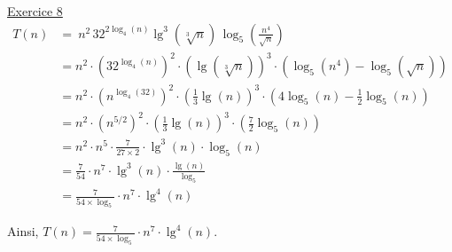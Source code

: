 \documentclass[11pt]{article}
\begin{document}
\bigskip


\underline{Exercice 8} 
\begin{align*}
   T(n)&=\ n^2\, 32^{ 2\log_4(n)} \lg^3\left(\sqrt[3]{n}\right) \, \log_5\left(\frac{n^4}{\sqrt{n}} \right) \\
   &= n^{2}\cdot \left(32^{\log_4(n)}\right)^{2}\cdot \left(\lg(\sqrt[3]{n})\right)^{3}\cdot \left(\log_5(n^{4})-\log_5(\sqrt{n})\right)\\
   &= n^{2} \cdot \left(n^{\log_4(32)}\right)^{2}\cdot \left(\frac{1}{3}\lg(n)\right)^{3}\cdot \left(4\log_5(n) - \frac{1}{2}\log_5(n)\right)\\
   &= n^{2} \cdot \left(n^{5/2}\right)^{2} \cdot \left(\frac{1}{3}\lg(n)\right)^{3} \cdot \left(\frac{7}{2}\log_5(n)\right)\\
   &=n^{2} \cdot n^{5} \cdot \frac{7}{27\times2} \cdot\lg^{3}(n) \cdot \log_5(n)\\
   &=\frac{7}{54}\cdot n^{7}\cdot\lg^{3}(n) \cdot \frac{\lg(n)}{\log_5}\\
   &=\frac{7}{54\times\log_5}\cdot n^{7}\cdot\lg^{4}(n)
\end{align*}
 
Ainsi, $T(n) =\frac{7}{54\times\log_5}\cdot n^{7}\cdot\lg^{4}(n)$.
\end{document}
